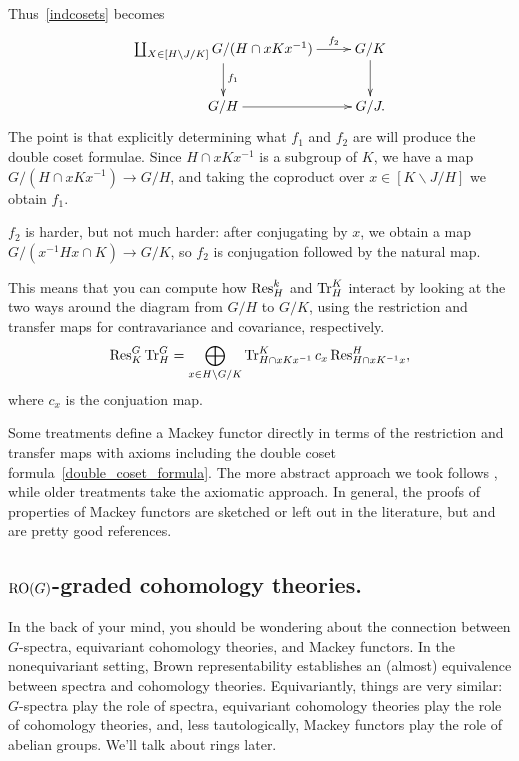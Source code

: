 Thus~\eqref{indcosets} becomes
\begin{equation}
\label{finalcsdiag}
\gathxy{
	\coprod_{X\in[H\backslash J/K]} G/(H\cap xKx^{-1})\ar[r]^-{f_2}\ar[d]^{f_1} & G/K\ar[d]\\
	G/H\ar[r] & G/J.
}
\end{equation}
The point is that explicitly determining what $f_1$ and $f_2$ are will produce the double coset formulae. Since
$H\cap xKx^{-1}$ is a subgroup of $K$, we have a map $G/(H\cap xKx^{-1})\to G/H$, and taking the coproduct over
$x\in[K\backslash J/H]$ we obtain $f_1$.

$f_2$ is harder, but not much harder: after conjugating by $x$, we obtain a map $G/(x^{-1}Hx\cap K)\to G/K$,
so $f_2$ is conjugation followed by the natural map.

This means that you can compute how $\operatorname{Res}_H^k$ and $\operatorname{Tr}_H^K$ interact by looking at the two ways around the
diagram from $G/H$ to $G/K$, using the restriction and transfer maps for contravariance and covariance,
respectively.
\begin{equation}
\label{double_coset_formula}
\operatorname{Res}_K^G\operatorname{Tr}_H^G = \bigoplus_{x\in H\backslash G/K} \operatorname{Tr}_{H\cap xKx^{-1}}^K c_x\operatorname{Res}_{H\cap xK^{-1}x}^H,
\end{equation}
where $c_x$ is the conjuation map.
\begin{rem}
Some treatments define a Mackey functor directly in terms of the restriction and transfer maps with axioms
including the double coset formula~\eqref{double_coset_formula}. The more abstract approach we took follows
\cite{Dress}, while older treatments take the axiomatic approach. In general, the proofs of properties of Mackey
functors are sketched or left out in the literature, but \cite{Webb} and  are pretty good
references.
\end{rem}
\subsection*{$\mathrm{RO}(G)$-graded cohomology theories.}
In the back of your mind, you should be wondering about the connection between $G$-spectra, equivariant cohomology
theories, and Mackey functors. In the nonequivariant setting, Brown representability establishes an (almost)
equivalence between spectra and cohomology theories. Equivariantly, things are very similar: $G$-spectra play the
role of spectra, equivariant cohomology theories play the role of cohomology theories, and, less tautologically,
Mackey functors play the role of abelian groups. We'll talk about rings later.

